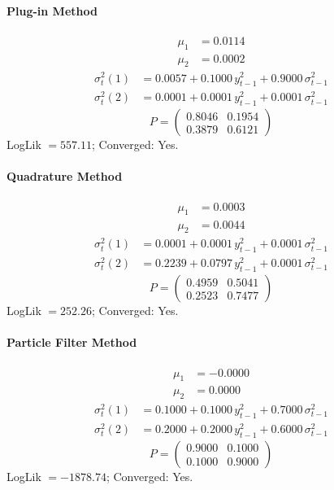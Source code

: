 \documentclass[11pt, a4paper]{article}
\begin{document}
\paragraph{Plug-in Method}
\begin{align}
\mu_{1} &= 0.0114 \\
\mu_{2} &= 0.0002
\end{align}
\begin{align}
\sigma^2_{t}(1) &= 0.0057 + 0.1000\, y_{t-1}^2 + 0.9000\, \sigma^2_{t-1} \\
\sigma^2_{t}(2) &= 0.0001 + 0.0001\, y_{t-1}^2 + 0.0001\, \sigma^2_{t-1}
\end{align}
\begin{equation}
P = \begin{pmatrix} 0.8046 & 0.1954 \\ 0.3879 & 0.6121 \end{pmatrix}
\end{equation}
LogLik $= 557.11$; Converged: Yes.

\paragraph{Quadrature Method}
\begin{align}
\mu_{1} &= 0.0003 \\
\mu_{2} &= 0.0044
\end{align}
\begin{align}
\sigma^2_{t}(1) &= 0.0001 + 0.0001\, y_{t-1}^2 + 0.0001\, \sigma^2_{t-1} \\
\sigma^2_{t}(2) &= 0.2239 + 0.0797\, y_{t-1}^2 + 0.0001\, \sigma^2_{t-1}
\end{align}
\begin{equation}
P = \begin{pmatrix} 0.4959 & 0.5041 \\ 0.2523 & 0.7477 \end{pmatrix}
\end{equation}
LogLik $= 252.26$; Converged: Yes.

\paragraph{Particle Filter Method}
\begin{align}
\mu_{1} &= -0.0000 \\
\mu_{2} &= 0.0000
\end{align}
\begin{align}
\sigma^2_{t}(1) &= 0.1000 + 0.1000\, y_{t-1}^2 + 0.7000\, \sigma^2_{t-1} \\
\sigma^2_{t}(2) &= 0.2000 + 0.2000\, y_{t-1}^2 + 0.6000\, \sigma^2_{t-1}
\end{align}
\begin{equation}
P = \begin{pmatrix} 0.9000 & 0.1000 \\ 0.1000 & 0.9000 \end{pmatrix}
\end{equation}
LogLik $= -1878.74$; Converged: Yes.
\end{document}
